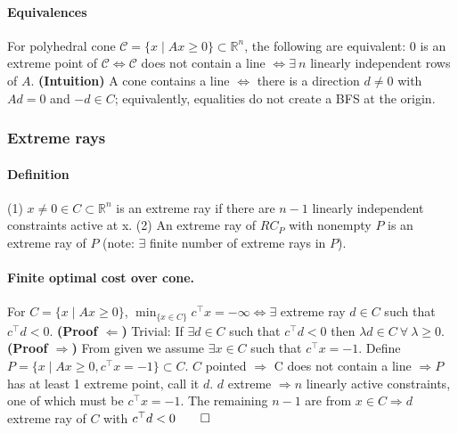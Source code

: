 \documentclass{article}
\begin{document}
\paragraph{Equivalences} For polyhedral cone $\mathcal C = \{x\mid Ax\geq0\} \subset \mathbb R^n$, the following are equivalent: $0$ is an extreme point of $\mathcal C\iff \mathcal C$ does not contain a line $\iff \exists\ n$ linearly independent rows of $A$. \textbf{(Intuition)} A cone contains a line $\iff$ there is a direction $d\neq 0$ with $Ad=0$ and $-d\in C$; equivalently, equalities do not create a BFS at the origin.

\subsubsection{Extreme rays}
\paragraph{Definition} (1) $x\neq 0 \in C \subset \mathbb R^n$ is an extreme ray if there are $n-1$ linearly independent constraints active at x. (2) An extreme ray of $RC_P$ with nonempty $P$ is an extreme ray of $P$ (note: $\exists$ finite number of extreme rays in $P$). 

\paragraph{Finite optimal cost over cone.} For $C=\{x\mid Ax\geq 0\}$, $\min_{\{x \in C\}} c^\top x = -\infty \iff \exists$ extreme ray $d\in C$ such that $c^\top d < 0$. \textbf{(Proof $\Leftarrow$)} Trivial: If $\exists d\in C$ such that $c^\top d < 0$ then $\lambda d\in C\ \forall\ \lambda \geq 0$. \textbf{(Proof $\Rightarrow$)} From given we assume $\exists x\in C$ such that $c^\top x = -1$. Define $P = \{x \mid Ax \geq 0, c^\top x = -1\}\subset C$. $C$ pointed $\Rightarrow $ C does not contain a line $\Rightarrow P$ has at least 1 extreme point, call it $d$. $d$ extreme $\Rightarrow n$ linearly active constraints, one of which must be $c^\top x = -1$. The remaining $n-1$ are from $x \in C \Longrightarrow d$ extreme ray of $C$ with $c^\top d < 0 \qed$ 
\end{document}
